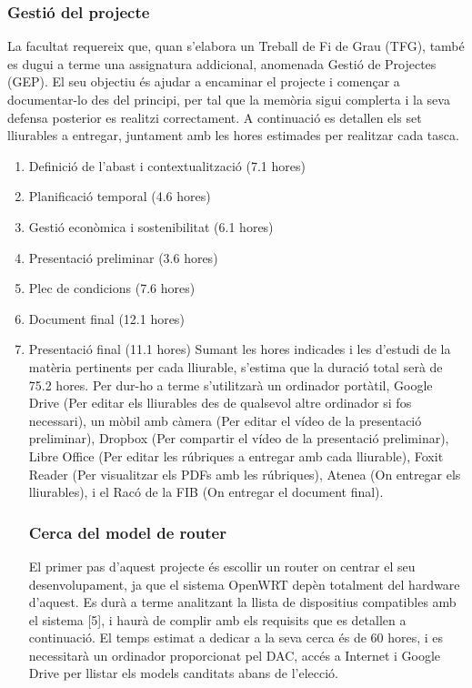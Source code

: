 \documentclass{article}
\begin{document}
\begin{enumerate}
\begin{enumerate}
\subsubsection{Gestió del projecte}
La facultat requereix que, quan s’elabora un Treball de Fi de Grau (TFG), també es dugui a terme una assignatura addicional,  anomenada Gestió de Projectes (GEP). El seu objectiu és ajudar a encaminar el projecte i començar a documentar-lo des del principi, per tal que la memòria sigui complerta i la seva defensa posterior es realitzi correctament. A continuació es detallen els set lliurables a entregar, juntament amb les hores estimades per realitzar cada tasca.
\begin{enumerate}
\item Definició de l’abast i contextualització (7.1 hores)
\item Planificació temporal (4.6 hores)
\item Gestió econòmica i sostenibilitat (6.1 hores)
\item Presentació preliminar (3.6 hores)
\item Plec de condicions (7.6 hores)
\item Document final (12.1 hores)
\item Presentació final (11.1 hores)
Sumant les hores indicades i les d’estudi de la matèria pertinents per cada lliurable, s’estima que la duració total serà de 75.2 hores.
Per dur-ho a terme s’utilitzarà un ordinador portàtil, Google Drive (Per editar els lliurables des de qualsevol altre ordinador si fos necessari), un mòbil amb càmera (Per editar el vídeo de la presentació preliminar), Dropbox (Per compartir el vídeo de la presentació preliminar), Libre Office (Per editar les rúbriques a entregar amb cada lliurable), Foxit Reader (Per visualitzar els PDFs amb les rúbriques), Atenea (On entregar els lliurables), i el Racó de la FIB (On entregar el document final).
\subsubsection{Cerca del model de router}
El primer pas d’aquest projecte és escollir un router on centrar el seu desenvolupament, ja que el sistema OpenWRT depèn totalment del hardware d’aquest. Es durà a terme analitzant la llista de dispositius compatibles amb el sistema [5], i haurà de complir amb els requisits que es detallen a continuació. El temps estimat a dedicar a la seva cerca és de 60 hores, i es necessitarà un ordinador proporcionat pel DAC, accés a Internet i Google Drive per llistar els models canditats abans de l’elecció.

\end{enumerate}
\end{enumerate}
\end{enumerate}
\end{document}
